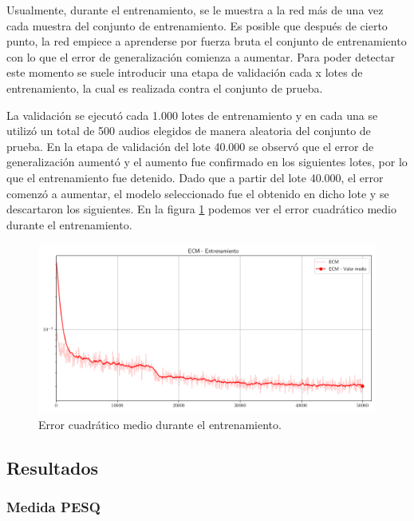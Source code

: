 Usualmente, durante el entrenamiento, se le muestra a la red más de una vez cada muestra del conjunto de entrenamiento. Es posible que después de cierto punto, la red empiece a aprenderse por fuerza bruta el conjunto de entrenamiento con lo que el error de generalización comienza a aumentar. Para poder detectar este momento se suele introducir una etapa de validación cada x lotes de entrenamiento, la cual es realizada contra el conjunto de prueba. 

La validación se ejecutó cada 1.000 lotes de entrenamiento y en cada una se utilizó un total de 500 audios elegidos de manera aleatoria del conjunto de prueba. En la etapa de validación del lote 40.000 se observó que el error de generalización aumentó y el aumento fue confirmado en los siguientes lotes, por lo que el entrenamiento fue detenido. Dado que a partir del lote 40.000, el error comenzó a aumentar, el modelo seleccionado fue el obtenido en dicho lote y se descartaron los siguientes. En la figura \ref{fig:ch7_entrenamiento_mse} podemos ver el error cuadrático medio durante el entrenamiento.

\begin{figure}
	\centering
	\centerline{\includegraphics[scale=0.65]{images/ch7/train_mse.png}}
	\caption{Error cuadrático medio durante el entrenamiento.}
	\label{fig:ch7_entrenamiento_mse}
\end{figure}

\subsection{Resultados}
\label{sec:resultados_filtro_neuronal}

\subsubsection{Medida PESQ}

